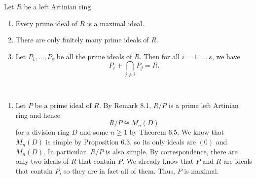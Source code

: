 \begin{lemma}{}
Let $R$ be a left Artinian ring. 
\begin{enumerate}[(1)]
    \item Every prime ideal of $R$ is a maximal ideal. 
    \item There are only finitely many prime ideals of $R$. 
    \item Let $P_1, \dots, P_s$ be all the prime ideals of $R$. Then for all $i = 1, \dots, s$, we have 
    \[ P_i + \bigcap_{j \neq i} P_j = R. \]
\end{enumerate}
\end{lemma}
\begin{pf}~
\begin{enumerate}[(1)]
    \item Let $P$ be a prime ideal of $R$. By Remark 8.1, $R/P$ is a prime left Artinian ring 
    and hence 
    \[ R/P \cong M_n(D) \]
    for a division ring $D$ and some $n \geq 1$ by Theorem 6.5. We know that $M_n(D)$ is simple by 
    Proposition 6.3, so its only ideals are $(0)$ and $M_n(D)$. In particular, $R/P$ is also simple. 
    By correspondence, there are only two ideals of $R$ that contain $P$. We already know that 
    $P$ and $R$ are ideals that contain $P$, so they are in fact all of them. Thus, $P$ is 
    maximal. 
    

\end{enumerate}
\end{pf}
